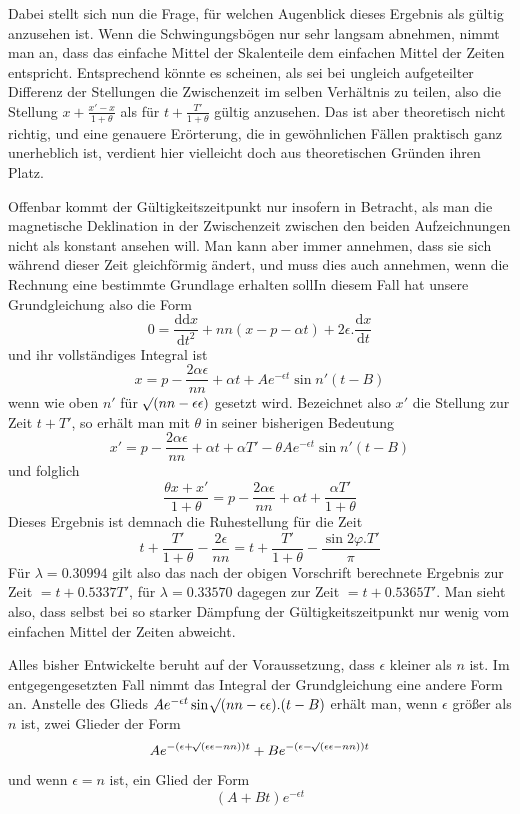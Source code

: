 Dabei stellt sich nun die Frage, für welchen Augenblick dieses Ergebnis als gültig anzusehen ist. Wenn die Schwingungsbögen nur sehr langsam abnehmen, nimmt man an, dass das einfache Mittel der Skalenteile dem einfachen Mittel der Zeiten entspricht. Entsprechend könnte es scheinen, als sei bei ungleich aufgeteilter Differenz der Stellungen die Zwischenzeit im selben Verhältnis zu teilen, also die Stellung $x+\frac{x'-x}{1+\theta}$ als für $t+\frac{T'}{1+\theta}$ gültig anzusehen. Das ist aber theoretisch nicht richtig, und eine genauere Erörterung, die in gewöhnlichen Fällen praktisch ganz unerheblich ist, verdient hier vielleicht doch aus theoretischen Gründen ihren Platz.

Offenbar kommt der Gültigkeitszeitpunkt nur insofern in Betracht, als man die magnetische Deklination in der Zwischenzeit zwischen den beiden Aufzeichnungen nicht als konstant ansehen will. Man kann aber immer annehmen, dass sie sich während dieser Zeit gleichförmig ändert, und muss dies auch annehmen, wenn die Rechnung eine bestimmte Grundlage erhalten soll\quad In diesem Fall hat unsere Grundgleichung also die Form
\[
0=\frac{\mathrm{d}\mathrm{d}x}{\mathrm{d}t^2}+nn(x-p-\alpha t)+2\epsilon.\frac{\mathrm{d}x}{\mathrm{d}t}
\]
und ihr vollständiges Integral ist
\[
x=p-\frac{2\alpha\epsilon}{nn}+\alpha t+Ae^{-\epsilon t}\sin n'(t-B)
\]
wenn wie oben $n'$ für $\mathord{{}^{}\!\surd}(nn-\epsilon\epsilon)$ gesetzt wird. Bezeichnet also $x'$ die Stellung zur Zeit $t+T'$, so erhält man mit $\theta$ in seiner bisherigen Bedeutung
\[
x'=p-\frac{2\alpha\epsilon}{nn}+\alpha t+\alpha T'-\theta Ae^{-\epsilon t}\sin n'(t-B)
\]
und folglich
\[
\frac{\theta x+x'}{1+\theta}=p-\frac{2\alpha\epsilon}{nn}+\alpha t+\frac{\alpha T'}{1+\theta}
\]
Dieses Ergebnis ist demnach die Ruhestellung für die Zeit
\[
t+\frac{T'}{1+\theta}-\frac{2\epsilon}{nn}=t+\frac{T'}{1+\theta}-\frac{\sin2\varphi.T'}{\pi}
\]
Für $\lambda=0.30994$ gilt also das nach der obigen Vorschrift berechnete Ergebnis zur Zeit $=t+0.5337T'$, für $\lambda=0.33570$ dagegen zur Zeit $=t+0.5365T'$.
Man sieht also, dass selbst bei so starker Dämpfung der Gültigkeitszeitpunkt nur wenig vom einfachen Mittel der Zeiten abweicht.

Alles bisher Entwickelte beruht auf der Voraussetzung, dass $\epsilon$ kleiner als $n$ ist. Im entgegengesetzten Fall nimmt das Integral der Grundgleichung eine andere Form an. Anstelle des Glieds $Ae^{-\epsilon t}\sin\mathord{{}^{}\!\surd}(nn-\epsilon\epsilon).(t-B)$ erhält man, wenn $\epsilon$ größer als $n$ ist, zwei Glieder der Form
\[
Ae^{-(\epsilon+\mathord{{}^{}\!\surd}(\epsilon\epsilon-nn))t}+Be^{-(\epsilon-\mathord{{}^{}\!\surd}(\epsilon\epsilon-nn))t}
\]
und wenn $\epsilon=n$ ist, ein Glied der Form
\[
(A+Bt)e^{-\epsilon t}
\]

